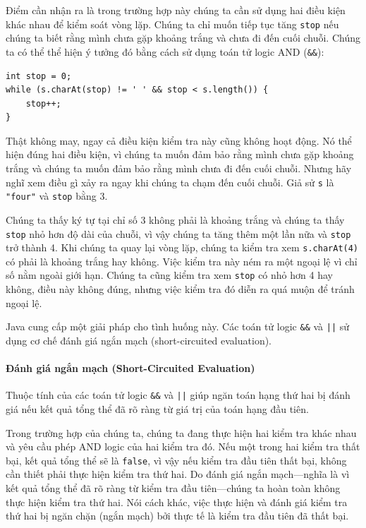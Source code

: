 Điểm cần nhận ra là trong trường hợp này chúng ta cần sử dụng hai điều kiện khác nhau để kiểm soát vòng lặp. Chúng ta chỉ muốn tiếp tục tăng \texttt{stop} nếu chúng ta biết rằng mình chưa gặp khoảng trắng và chưa đi đến cuối chuỗi. Chúng ta có thể thể hiện ý tưởng đó bằng cách sử dụng toán tử logic AND (\texttt{\&\&}):

\begin{verbatim}
int stop = 0;
while (s.charAt(stop) != ' ' && stop < s.length()) {
    stop++;
}
\end{verbatim}

Thật không may, ngay cả điều kiện kiểm tra này cũng không hoạt động. Nó thể hiện đúng hai điều kiện, vì chúng ta muốn đảm bảo rằng mình chưa gặp khoảng trắng và chúng ta muốn đảm bảo rằng mình chưa đi đến cuối chuỗi. Nhưng hãy nghĩ xem điều gì xảy ra ngay khi chúng ta chạm đến cuối chuỗi. Giả sử \texttt{s} là \texttt{"four"} và \texttt{stop} bằng 3.

Chúng ta thấy ký tự tại chỉ số 3 không phải là khoảng trắng và chúng ta thấy \texttt{stop} nhỏ hơn độ dài của chuỗi, vì vậy chúng ta tăng thêm một lần nữa và \texttt{stop} trở thành 4. Khi chúng ta quay lại vòng lặp, chúng ta kiểm tra xem \texttt{s.charAt(4)} có phải là khoảng trắng hay không. Việc kiểm tra này ném ra một ngoại lệ vì chỉ số nằm ngoài giới hạn. Chúng ta cũng kiểm tra xem \texttt{stop} có nhỏ hơn 4 hay không, điều này không đúng, nhưng việc kiểm tra đó diễn ra quá muộn để tránh ngoại lệ.

Java cung cấp một giải pháp cho tình huống này. Các toán tử logic \texttt{\&\&} và \texttt{||} sử dụng cơ chế đánh giá ngắn mạch (short-circuited evaluation).

\paragraph{Đánh giá ngắn mạch (Short-Circuited Evaluation)}
Thuộc tính của các toán tử logic \texttt{\&\&} và \texttt{||} giúp ngăn toán hạng thứ hai bị đánh giá nếu kết quả tổng thể đã rõ ràng từ giá trị của toán hạng đầu tiên.

Trong trường hợp của chúng ta, chúng ta đang thực hiện hai kiểm tra khác nhau và yêu cầu phép AND logic của hai kiểm tra đó. Nếu một trong hai kiểm tra thất bại, kết quả tổng thể sẽ là \texttt{false}, vì vậy nếu kiểm tra đầu tiên thất bại, không cần thiết phải thực hiện kiểm tra thứ hai. Do đánh giá ngắn mạch—nghĩa là vì kết quả tổng thể đã rõ ràng từ kiểm tra đầu tiên—chúng ta hoàn toàn không thực hiện kiểm tra thứ hai. Nói cách khác, việc thực hiện và đánh giá kiểm tra thứ hai bị ngăn chặn (ngắn mạch) bởi thực tế là kiểm tra đầu tiên đã thất bại.

